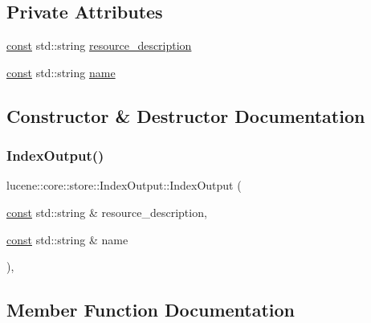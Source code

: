 \subsection*{Private Attributes}
\begin{DoxyCompactItemize}
\item 
\mbox{\hyperlink{ZlibCrc32_8h_a2c212835823e3c54a8ab6d95c652660e}{const}} std\+::string \mbox{\hyperlink{classlucene_1_1core_1_1store_1_1IndexOutput_a0e2f8c314606011f681c74811be781aa}{resource\+\_\+description}}
\item 
\mbox{\hyperlink{ZlibCrc32_8h_a2c212835823e3c54a8ab6d95c652660e}{const}} std\+::string \mbox{\hyperlink{classlucene_1_1core_1_1store_1_1IndexOutput_ab897c3a1151b60666f513e2cb13189d7}{name}}
\end{DoxyCompactItemize}


\subsection{Constructor \& Destructor Documentation}
\mbox{\label{classlucene_1_1core_1_1store_1_1IndexOutput_a2e11e162d0922f41b7943663eaaf6a3e}} 
\subsubsection{\texorpdfstring{Index\+Output()}{IndexOutput()}}
{\footnotesize\ttfamily lucene\+::core\+::store\+::\+Index\+Output\+::\+Index\+Output (\begin{DoxyParamCaption}\item[{\mbox{\hyperlink{ZlibCrc32_8h_a2c212835823e3c54a8ab6d95c652660e}{const}} std\+::string \&}]{resource\+\_\+description,  }\item[{\mbox{\hyperlink{ZlibCrc32_8h_a2c212835823e3c54a8ab6d95c652660e}{const}} std\+::string \&}]{name }\end{DoxyParamCaption})\hspace{0.3cm}{\ttfamily [inline]}, {\ttfamily [protected]}}



\subsection{Member Function Documentation}
\mbox{\label{classlucene_1_1core_1_1store_1_1IndexOutput_a6317af8a5c9359eb687fd182ac3a6ea4}} 
